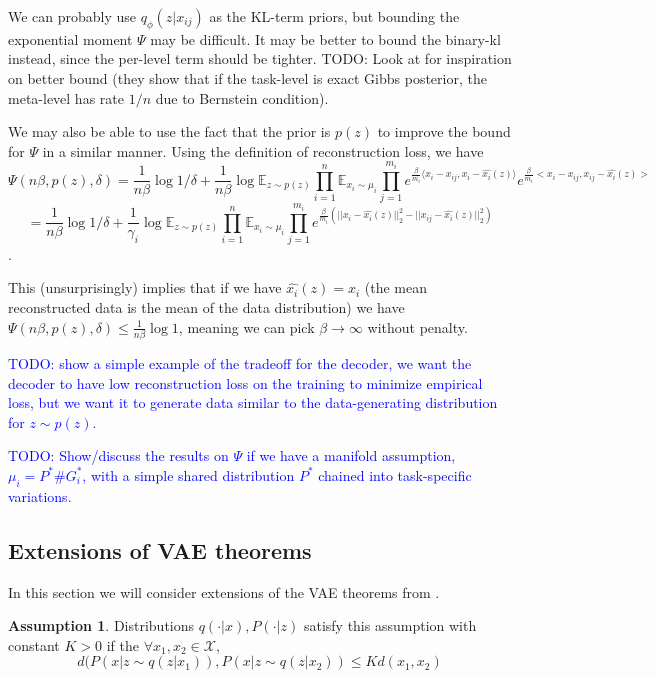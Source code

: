 \documentclass[letterpaper]{article}
\theoremstyle{definition}
\newtheorem{assumption}{Assumption}
\newcommand{\LF}[1]{{\textcolor{blue}{#1}}}
\begin{document}
We can probably use $q_\phi(z|x_{ij})$ as the KL-term priors, but bounding the exponential moment $\Psi$ may be difficult.
It may be better to bound the binary-kl instead, since the per-level term should be tighter. TODO: Look at \citep{riou2023bayes} for inspiration on better bound (they show that if the task-level is exact Gibbs posterior, the meta-level has rate $1/n$ due to Bernstein condition). 

We may also be able to use the fact that the prior is $p(z)$ to improve the bound for $\Psi$ in a similar manner. Using the definition of reconstruction loss, we have
$$\Psi(n\beta,p(z),\delta)=\frac{1}{n\beta}\log1/\delta+\frac{1}{n\beta}\log \mathbb{E}_{z\sim p(z)}\prod_{i=1}^{n}\mathbb{E}_{x_i\sim \mu_i}\prod_{j=1}^{m_i}e^{\frac{\beta}{m_i}\langle x_i-x_{ij},x_i-\hat{x_i}(z)\rangle}e^{\frac{\beta}{m_i}<x_i-x_{ij},x_{ij}-\hat{x_i}(z)>}$$
$$=\frac{1}{n\beta}\log1/\delta+\frac{1}{\gamma_i}\log \mathbb{E}_{z\sim p(z)}\prod_{i=1}^{n}\mathbb{E}_{x_i\sim \mu_i}\prod_{j=1}^{m_i}e^{\frac{\beta}{m_i}(||x_i-\hat{x_i}(z)||^2_2-||x_{ij}-\hat{x_i}(z)||^2_2)}$$.

This (unsurprisingly) implies that if we have $\hat{x_i}(z)=x_i$ (the mean reconstructed data is the mean of the data distribution) we have $\Psi(n\beta,p(z),\delta)\leq \frac{1}{n\beta}\log 1$, meaning we can pick $\beta\rightarrow\infty$ without penalty. 

\LF{TODO: show a simple example of the tradeoff for the decoder, we want the decoder to have low reconstruction loss on the training to minimize empirical loss, but we want it to generate data similar to the data-generating distribution for $z\sim p(z)$.}

\LF{TODO: Show/discuss the results on $\Psi$ if we have a manifold assumption, $\mu_i= P^*\#G^*_i$, with a simple shared distribution $P^*$ chained into task-specific variations. }

\subsection{Extensions of VAE theorems}
In this section we will consider extensions of the VAE theorems from \citep{mbacke2023statistical}.

\begin{assumption} \label{assume:reconstruction-dists} 
Distributions $q(\cdot | x), P(\cdot|z)$ satisfy this assumption with constant $K>0$ if the $\forall x_1,x_2 \in \mathcal{X}$, $$d(P(x|z\sim q(z | x_1)), P(x|z\sim q(z | x_2))\leq K d(x_1,x_2)$$
\end{assumption}
\end{document}
